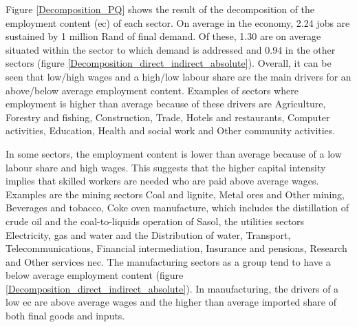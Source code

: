 \documentclass[12pt,english]{article}
\begin{document}
Figure \ref{Decomposition_PQ} shows the result of the decomposition of the employment content (ec) of each sector. %
On average in the economy, 2.24 jobs are sustained by 1 million Rand of final demand. Of these, 1.30 are on average situated within the sector to which demand is addressed and 0.94 in the other sectors (figure \ref{Decomposition_direct_indirect_absolute}). Overall, it can be seen that low/high wages and a high/low labour share are the main drivers for an above/below average employment content. Examples of sectors where employment is higher than average because of these drivers are Agriculture, Forestry and fishing, Construction, Trade, Hotels and restaurants, Computer activities, Education, Health and social work and Other community activities. 

In some sectors, the employment content is lower than average because of a low labour share and high wages. This suggests that the higher capital intensity implies that skilled workers are needed who are paid above average wages. Examples are the mining sectors Coal and lignite, Metal ores and Other mining, Beverages and tobacco, Coke oven manufacture, which includes the distillation of crude oil and the coal-to-liquids operation of Sasol, the utilities sectors Electricity, gas and water and the Distribution of water, Transport, Telecommunications, Financial intermediation, Insurance and pensions, Research and Other services nec. The manufacturing sectors as a group tend to have a below average employment content (figure \ref{Decomposition_direct_indirect_absolute}). In manufacturing, the drivers of a low ec are above average wages and the higher than average imported share of both final goods and inputs. 


\end{document}

